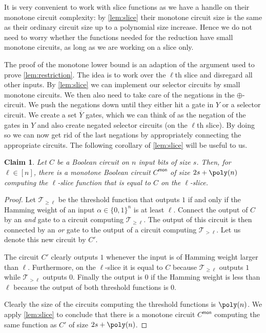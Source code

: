 \documentclass[10pt,a4paper]{article}
\theoremstyle{plain}
\newtheorem{claim}[theorem]{Claim}
\theoremstyle{remark}
\theoremstyle{definition}
\newcommand{\set}[1]{\{#1\}}
\newcommand{\calT}{\mathcal{T}}
\newcommand{\mon}{{\mathsf{mon}}}
\begin{document}
It is very convenient to work with slice functions as we have a handle
on their monotone circuit complexity: by \cref{lem:slice} their
monotone circuit size is the same as their ordinary circuit size up to
a polynomial size increase. Hence we do not need to worry whether the
functions needed for the reduction have small monotone circuits, as
long as we are working on a slice only. 

The proof of the monotone lower bound is an adaption of the argument
used to prove
\cref{lem:restriction}. %
The idea is to work over
the $\ell$th slice and disregard all other inputs.  By
\cref{lem:slice} we can implement our selector circuits by small
monotone circuits. We then also need to take care of the negations in
the $\oplus$-circuit. We push the negations down until they either hit
a gate in $Y$ or a selector circuit. We create a set $\overline Y$
gates, which we can think of as the negation of the gates in $Y$ and
also create negated selector circuits (on the $\ell$th slice). By
doing so we can now get rid of the last negations by appropriately
connecting the appropriate circuits. The following corollary of
\cref{lem:slice} will be useful to us.

\begin{claim}
  \label{clm:to-slice}
  Let $C$ be a Boolean circuit on $n$ input bits of size $s$. Then,
  for $\ell \in [n]$, there is a monotone Boolean circuit $C^\mon$ of
  size $2s + \poly(n)$ computing the $\ell$-slice function that is
  equal to $C$ on the $\ell$-slice.
\end{claim}

\begin{proof}
  Let $\calT_{\ge \ell}$ be the threshold function that outputs $1$ if
  and only if the Hamming weight of an input $\alpha \in \set{0,1}^n$
  is at least $\ell$. Connect the output of $C$ by an \emph{and} gate
  to a circuit computing $\calT_{\ge \ell}$. The output of this
  circuit is then connected by an \emph{or} gate to the output of a
  circuit computing $\calT_{> \ell}$. Let us denote this new circuit
  by $C'$.

  The circuit $C'$ clearly outputs $1$ whenever the input is of
  Hamming weight larger than $\ell$. Furthermore, on the $\ell$-slice
  it is equal to $C$ because $\calT_{\ge \ell}$ outputs $1$ while
  $\calT_{> \ell}$ outputs $0$. Finally the output is $0$ if the
  Hamming weight is less than $\ell$ because the output of both
  threshold functions is $0$.

  Clearly the size of the circuits computing the threshold functions
  is $\poly(n)$. We apply \cref{lem:slice} to conclude that there is a
  monotone circuit $C^\mon$ computing the same function as $C'$ of
  size $2s + \poly(n)$.
\end{proof}
\end{document}
